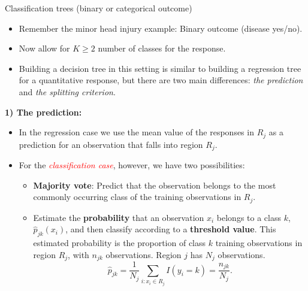 \documentclass[10pt,ignorenonframetext,]{beamer}
\providecommand{\tightlist}{%
  \setlength{\itemsep}{0pt}\setlength{\parskip}{0pt}}
\begin{document}
\begin{frame}{Classification trees (binary or categorical outcome)}

\vspace{2mm}

\begin{itemize}
\tightlist
\item
  Remember the minor head injury example: Binary outcome (disease
  yes/no).
\end{itemize}

\vspace{1mm}

\begin{itemize}
\tightlist
\item
  Now allow for \(K\geq 2\) number of classes for the response.
\end{itemize}

\vspace{1mm}

\begin{itemize}
\tightlist
\item
  Building a decision tree in this setting is similar to building a
  regression tree for a quantitative response, but there are two main
  differences: \emph{the prediction} and \emph{the splitting criterion}.
\end{itemize}

\end{frame}

\begin{frame}

\textbf{1) The prediction:}

\begin{itemize}
\item
  In the regression case we use the mean value of the responses in
  \(R_j\) as a prediction for an observation that falls into region
  \(R_j\). \vspace{2mm}
\item
  For the \emph{\textcolor{red}{classification case}}, however, we have
  two possibilities:

  \begin{itemize}
  \tightlist
  \item
    \textbf{Majority vote}: Predict that the observation belongs to the
    most commonly occurring class of the training observations in
    \(R_j\).\\
  \item
    Estimate the \textbf{probability} that an observation \(x_i\)
    belongs to a class \(k\), \(\hat{p}_{jk}(x_i)\), and then classify
    according to a \textbf{threshold value}. This estimated probability
    is the proportion of class \(k\) training observations in region
    \(R_j\), with \(n_{jk}\) observations. Region \(j\) has \(N_j\)
    observations.
    \[\hat{p}_{jk} = \frac{1}{N_j} \sum_{i:x_i \in R_j} I(y_i = k)=\frac{n_{jk}}{N_j}.\]
  \end{itemize}
\end{itemize}

\end{frame}
\end{document}
